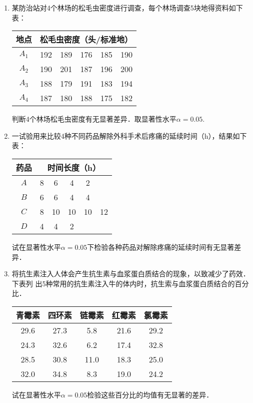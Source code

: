 \documentclass[10pt,a4paper]{article}
\begin{document}
\begin{enumerate}
    \item 某防治站对4个林场的松毛虫密度进行调查，每个林场调查5块地得资料如下表：
    \renewcommand{\arraystretch}{1.3}
    \begin{table}[H]\centering
        \begin{tabular}{cccccc}
        \hline
        地点    & \multicolumn{5}{c}{松毛虫密度（头/标准地）} \\ \hline
        $A_1$ & 192  & 189  & 176  & 185  & 190  \\
        $A_2$ & 190  & 201  & 187  & 196  & 200  \\
        $A_3$ & 188  & 179  & 191  & 183  & 194  \\
        $A_4$ & 187  & 180  & 188  & 175  & 182  \\ \hline
        \end{tabular}
        \end{table}
    判断4个林场松毛虫密度有无显著差异．取显著性水平$\alpha=0.05$.
    \renewcommand{\arraystretch}{1.0}




    \item 一试验用来比较4种不同药品解除外科手术后疼痛的延续时间（h），结果如下表：
    \renewcommand{\arraystretch}{1.3}
    \begin{table}[H]\centering
        \begin{tabular}{cccccc}
        \hline
        药品  & \multicolumn{5}{c}{时间长度（h）} \\ \hline
        $A$ & 8   & 6   & 4   & 2   &     \\
        $B$ & 6   & 6   & 4   & 4   &     \\
        $C$ & 8   & 10  & 10  & 10  & 12  \\
        $D$ & 4   & 4   & 2   &     &     \\ \hline
        \end{tabular}
    \end{table}
    \renewcommand{\arraystretch}{1.0}
    试在显著性水平$\alpha=0.05$下检验各种药品对解除疼痛的延续时间有无显著差异．




    \item 将抗生素注入人体会产生抗生素与血浆蛋白质结合的现象，以致减少了药效．下表列
    出5种常用的抗生素注入牛的体内时，抗生索与血浆蛋白质结合的百分比．
    \renewcommand{\arraystretch}{1.3}
    \begin{table}[H]\centering
        \begin{tabular}{ccccc}
        \hline
        青霉素  & 四环素  & 链霉素  & 红霉素  & 氯霉素  \\ \hline
        29.6 & 27.3 & 5.8  & 21.6 & 29.2 \\
        24.3 & 32.6 & 6.2  & 17.4 & 32.8 \\
        28.5 & 30.8 & 11.0 & 18.3 & 25.0 \\
        32.0 & 34.8 & 8.3  & 19.0 & 24.2 \\ \hline
        \end{tabular}
    \end{table}
    \renewcommand{\arraystretch}{1.0}
    试在显著性水平$\alpha=0.05$检验这些百分比的均值有无显著的差异．




\end{enumerate}
\end{document}
